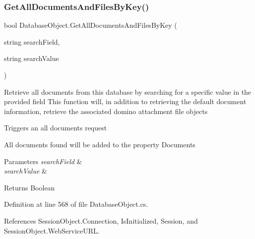 \subsubsection{\texorpdfstring{Get\+All\+Documents\+And\+Files\+By\+Key()}{GetAllDocumentsAndFilesByKey()}}
{\footnotesize\ttfamily bool Database\+Object.\+Get\+All\+Documents\+And\+Files\+By\+Key (\begin{DoxyParamCaption}\item[{string}]{search\+Field,  }\item[{string}]{search\+Value }\end{DoxyParamCaption})}



Retrieve all documents from this database by searching for a specific value in the provided field This function will, in addition to retrieving the default document information, retrieve the associated domino attachment file objects 

Triggers an all documents request

All documents found will be added to the property \textquotesingle{}Documents\textquotesingle{}


\begin{DoxyParams}{Parameters}
{\em search\+Field} & \\
\hline
{\em search\+Value} & \\
\hline
\end{DoxyParams}
\begin{DoxyReturn}{Returns}
Boolean
\end{DoxyReturn}


Definition at line 568 of file Database\+Object.\+cs.



References Session\+Object.\+Connection, Is\+Initialized, Session, and Session\+Object.\+Web\+Service\+U\+RL.


